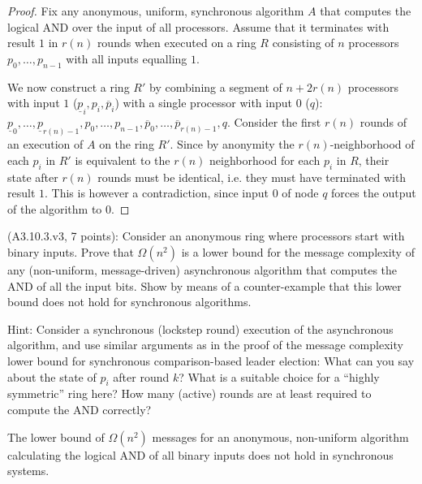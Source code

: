 \begin{proof}
Fix any anonymous, uniform, synchronous algorithm $A$ that computes the logical AND over the input of
all processors. Assume that it terminates with result $1$ in $r(n)$ rounds when executed on a ring $R$ consisting
of $n$ processors $p_0, \ldots, p_{n-1}$ with all inputs equalling $1$.

We now construct a ring $R'$ by combining a segment of $n + 2r(n)$ processors with input $1$
($\underline{p}_i, p_i, \overline{p}_i$) with a single processor with input $0$ ($q$):
$\underline{p}_0, \ldots, \underline{p}_{r(n) - 1},
 p_0, \ldots, p_{n-1},
 \overline{p}_0, \ldots, \overline{p}_{r(n) - 1},
 q.$
Consider the first $r(n)$ rounds of an execution of $A$ on the ring $R'$. Since by anonymity
the $r(n)$-neighborhood
of each $p_i$ in $R'$ is equivalent to the $r(n)$ neighborhood for each $p_i$ in $R$, their state
after $r(n)$ rounds must be identical, i.e. they must have terminated with result $1$. This is however
a contradiction, since input $0$ of node $q$ forces the output of the algorithm to $0$.
\end{proof}


\begin{Exc}{(A3.10.3.v3, 7 points):}
Consider an anonymous ring where processors start with binary
inputs. Prove that $\Omega(n^2)$ is a lower bound for the
message complexity of any (non-uniform, message-driven)
asynchronous algorithm that computes the AND of all the
input bits. Show by means of a counter-example that this
lower bound does not hold for synchronous algorithms.

\normalfont
Hint: Consider a synchronous (lockstep round) execution of the asynchronous
algorithm, and use similar arguments as in the proof of the message complexity lower bound
for synchronous comparison-based leader election: What can you say about the state of $p_i$ after
round $k$? What is a suitable choice for a ``highly symmetric'' ring here? How many
(active) rounds are at least required to compute the AND correctly?
\end{Exc}


\begin{theorem}
The lower bound of $\Omega(n^2)$ messages for an anonymous, non-uniform algorithm calculating the
logical AND of all binary inputs does not hold in synchronous systems.
\end{theorem}


